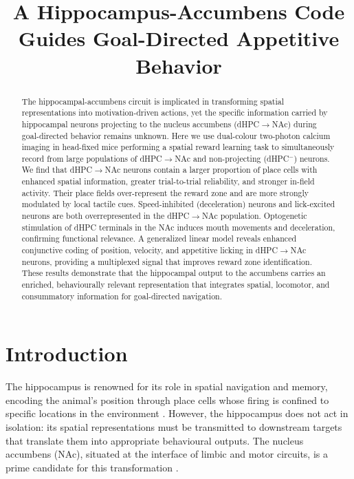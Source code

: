 \documentclass[11pt]{article}
\title{A Hippocampus-Accumbens Code Guides Goal-Directed Appetitive Behavior}
\author{}
\date{}
\begin{document}
\maketitle

\begin{abstract}
The hippocampal-accumbens circuit is implicated in transforming spatial representations into motivation-driven actions, yet the specific information carried by hippocampal neurons projecting to the nucleus accumbens (dHPC$\to$NAc) during goal-directed behavior remains unknown. Here we use dual-colour two-photon calcium imaging in head-fixed mice performing a spatial reward learning task to simultaneously record from large populations of dHPC$\to$NAc and non-projecting (dHPC$^{-}$) neurons. We find that dHPC$\to$NAc neurons contain a larger proportion of place cells with enhanced spatial information, greater trial-to-trial reliability, and stronger in-field activity. Their place fields over-represent the reward zone and are more strongly modulated by local tactile cues. Speed-inhibited (deceleration) neurons and lick-excited neurons are both overrepresented in the dHPC$\to$NAc population. Optogenetic stimulation of dHPC terminals in the NAc induces mouth movements and deceleration, confirming functional relevance. A generalized linear model reveals enhanced conjunctive coding of position, velocity, and appetitive licking in dHPC$\to$NAc neurons, providing a multiplexed signal that improves reward zone identification. These results demonstrate that the hippocampal output to the accumbens carries an enriched, behaviourally relevant representation that integrates spatial, locomotor, and consummatory information for goal-directed navigation.
\end{abstract}

\section{Introduction}

The hippocampus is renowned for its role in spatial navigation and memory, encoding the animal's position through place cells whose firing is confined to specific locations in the environment \citep{okeefe1971hippocampus,moser2008place}. However, the hippocampus does not act in isolation: its spatial representations must be transmitted to downstream targets that translate them into appropriate behavioural outputs. The nucleus accumbens (NAc), situated at the interface of limbic and motor circuits, is a prime candidate for this transformation \citep{mogenson1980hippocampal,ito2008dissociation}.
\end{document}
